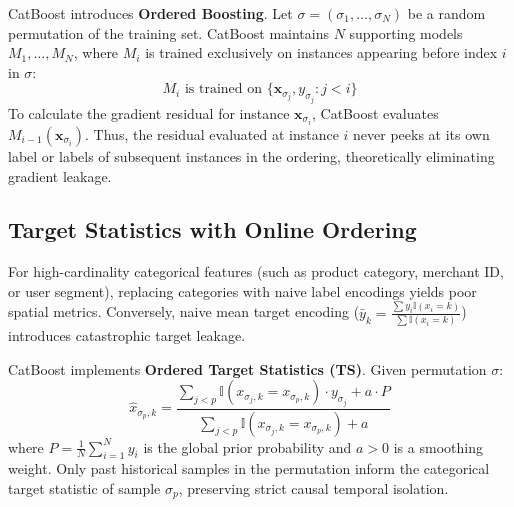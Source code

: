 \documentclass[11pt,a4paper]{article}
\begin{document}
CatBoost introduces \textbf{Ordered Boosting}. Let $\sigma = (\sigma_1, \dots, \sigma_N)$ be a random permutation of the training set. CatBoost maintains $N$ supporting models $M_1, \dots, M_N$, where $M_i$ is trained exclusively on instances appearing before index $i$ in $\sigma$:
\begin{equation}
    M_i \text{ is trained on } \{\mathbf{x}_{\sigma_j}, y_{\sigma_j} : j < i\}
\end{equation}
To calculate the gradient residual for instance $\mathbf{x}_{\sigma_i}$, CatBoost evaluates $M_{i-1}(\mathbf{x}_{\sigma_i})$. Thus, the residual evaluated at instance $i$ never peeks at its own label or labels of subsequent instances in the ordering, theoretically eliminating gradient leakage.

\subsection{Target Statistics with Online Ordering}
For high-cardinality categorical features (such as product category, merchant ID, or user segment), replacing categories with naive label encodings yields poor spatial metrics. Conversely, naive mean target encoding ($\bar{y}_k = \frac{\sum y_i \mathbb{I}(x_i = k)}{\sum \mathbb{I}(x_i = k)}$) introduces catastrophic target leakage.

CatBoost implements \textbf{Ordered Target Statistics (TS)}. Given permutation $\sigma$:
\begin{equation}
    \hat{x}_{\sigma_p, k} = \frac{\sum_{j < p} \mathbb{I}(x_{\sigma_j, k} = x_{\sigma_p, k}) \cdot y_{\sigma_j} + a \cdot P}{\sum_{j < p} \mathbb{I}(x_{\sigma_j, k} = x_{\sigma_p, k}) + a}
\end{equation}
where $P = \frac{1}{N}\sum_{i=1}^N y_i$ is the global prior probability and $a > 0$ is a smoothing weight. Only past historical samples in the permutation inform the categorical target statistic of sample $\sigma_p$, preserving strict causal temporal isolation.
\end{document}
